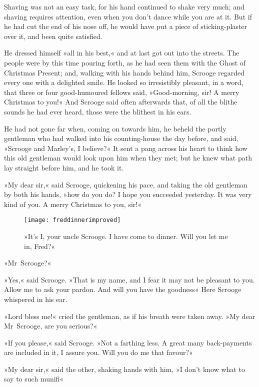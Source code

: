 Shaving was not an easy task, for his hand continued to shake very much; and shaving requires attention, even when you don't dance while you are at it. But if he had cut the end of his nose off, he would have put a piece of sticking-plaster over it, and been quite satisfied.

He dressed himself »all in his best,« and at last got out into the streets. The people were by this time pouring forth, as he had seen them with the Ghost of Christmas Present; and, walking with his hands behind him, Scrooge regarded every one with a delighted smile. He looked so irresistibly pleasant, in a word, that three or four good-humoured fellows said, »Good-morning, sir! A merry Christmas to you!« And Scrooge said often afterwards that, of all the blithe sounds he had ever heard, those were the blithest in his ears.

He had not gone far when, coming on towards him, he beheld the portly gentleman who had walked into his counting-house the day before, and said, »Scrooge and Marley's, I believe?« It sent a pang across his heart to think how this old gentleman would look upon him when they met; but he knew what path lay straight before him, and he took it.

»My dear sir,« said Scrooge, quickening his pace, and taking the old gentleman by both his hands, »how do you do? I hope you succeeded yesterday. It was very kind of you. A merry Christmas to you, sir!«

\begin{figure}[p]
\begin{minipage}[c]{\textwidth}
\texttt{[image: freddinnerimproved]}
\caption[\textbf{»Will you let me in, Fred?«}]{»It's I, your uncle Scrooge. I have come to dinner. Will you let me in, Fred?«}
\end{minipage}
\end{figure}

»Mr~Scrooge?«

»Yes,« said Scrooge. »That is my name, and I fear it may not be pleasant to you. Allow me to ask your pardon. And will you have the goodness\longdash« Here Scrooge whispered in his ear.

»Lord bless me!« cried the gentleman, as if his breath were taken away. »My dear Mr~Scrooge, are you serious?«

»If you please,« said Scrooge. »Not a farthing less. A great many back-payments are included in it, I assure you. Will you do me that favour?«

»My dear sir,« said the other, shaking hands with him, »I don't know what to say to such munifi\longdash«

